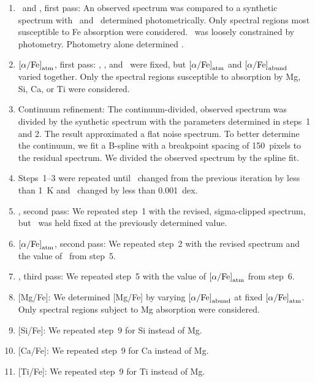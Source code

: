 \documentclass{emulateapj}
\begin{document}
\begin{enumerate}
\item \teff\ and \feh, first pass: An observed spectrum was compared
  to a synthetic spectrum with \teff\ and \logg\ determined
  photometrically.  Only spectral regions most susceptible to Fe
  absorption were considered.  \teff\ was loosely constrained by
  photometry.  Photometry alone determined \logg.

\item ${\rm [\alpha/Fe]}_{\rm atm}$, first pass: \teff, \logg, and
  \feh\ were fixed, but ${\rm [\alpha/Fe]}_{\rm atm}$ and ${\rm
    [\alpha/Fe]}_{\rm abund}$ varied together.  Only the spectral
  regions susceptible to absorption by Mg, Si, Ca, or Ti were
  considered.

\item Continuum refinement: The continuum-divided, observed spectrum
  was divided by the synthetic spectrum with the parameters determined
  in steps~1 and 2.  The result approximated a flat noise spectrum.
  To better determine the continuum, we fit a B-spline with a
  breakpoint spacing of 150~pixels to the residual spectrum.  We
  divided the observed spectrum by the spline fit.

\item Steps~1--3 were repeated until \teff\ changed from the previous
  iteration by less than 1~K and \feh\ changed by less than 0.001~dex.

\item \feh, second pass: We repeated step~1 with the revised,
  sigma-clipped spectrum, but \teff\ was held fixed at the previously
  determined value.

\item ${\rm [\alpha/Fe]}_{\rm atm}$, second pass: We repeated step~2
  with the revised spectrum and the value of \feh\ from step~5.

\item \feh, third pass: We repeated step~5 with the value of ${\rm
  [\alpha/Fe]}_{\rm atm}$ from step~6.

\item{[Mg/Fe]: We determined [Mg/Fe] by varying ${\rm
    [\alpha/Fe]}_{\rm abund}$ at fixed ${\rm [\alpha/Fe]}_{\rm atm}$.
  Only spectral regions subject to Mg absorption were considered.}

\item{[Si/Fe]: We repeated step~9 for Si instead of Mg.}

\item{[Ca/Fe]: We repeated step~9 for Ca instead of Mg.}

\item{[Ti/Fe]: We repeated step~9 for Ti instead of Mg.}
\end{enumerate}
\end{document}

